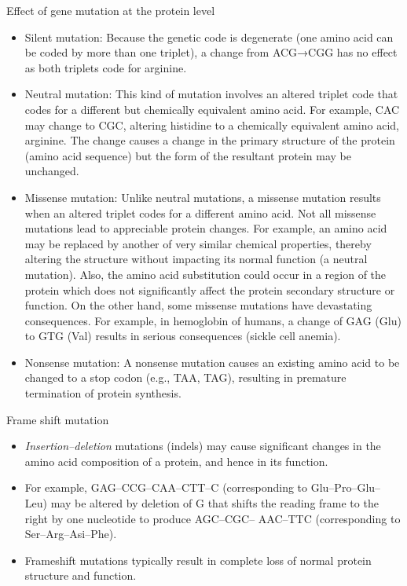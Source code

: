 \documentclass[11pt,ignorenonframetext,aspectratio=169]{beamer}
\providecommand{\tightlist}{%
  \setlength{\itemsep}{0pt}\setlength{\parskip}{0pt}}
\begin{document}
\begin{frame}{Effect of gene mutation at the protein level}
\protect\hypertarget{effect-of-gene-mutation-at-the-protein-level}{}
\small

\begin{itemize}
\tightlist
\item
  Silent mutation: Because the genetic code is degenerate (one amino
  acid can be coded by more than one triplet), a change from ACG→CGG has
  no effect as both triplets code for arginine.
\item
  Neutral mutation: This kind of mutation involves an altered triplet
  code that codes for a different but chemically equivalent amino acid.
  For example, CAC may change to CGC, altering histidine to a chemically
  equivalent amino acid, arginine. The change causes a change in the
  primary structure of the protein (amino acid sequence) but the form of
  the resultant protein may be unchanged.
\item
  Missense mutation: Unlike neutral mutations, a missense mutation
  results when an altered triplet codes for a different amino acid. Not
  all missense mutations lead to appreciable protein changes. For
  example, an amino acid may be replaced by another of very similar
  chemical properties, thereby altering the structure without impacting
  its normal function (a neutral mutation). Also, the amino acid
  substitution could occur in a region of the protein which does not
  significantly affect the protein secondary structure or function. On
  the other hand, some missense mutations have devastating consequences.
  For example, in hemoglobin of humans, a change of GAG (Glu) to GTG
  (Val) results in serious consequences (sickle cell anemia).
\item
  Nonsense mutation: A nonsense mutation causes an existing amino acid
  to be changed to a stop codon (e.g., TAA, TAG), resulting in premature
  termination of protein synthesis.
\end{itemize}
\end{frame}

\begin{frame}{Frame shift mutation}
\protect\hypertarget{frame-shift-mutation}{}
\begin{itemize}
\tightlist
\item
  \emph{Insertion--deletion} mutations (indels) may cause significant
  changes in the amino acid composition of a protein, and hence in its
  function.
\item
  For example, GAG--CCG--CAA--CTT--C (corresponding to
  Glu--Pro--Glu--Leu) may be altered by deletion of G that shifts the
  reading frame to the right by one nucleotide to produce AGC--CGC--
  AAC--TTC (corresponding to Ser--Arg--Asi--Phe).
\item
  Frameshift mutations typically result in complete loss of normal
  protein structure and function.
\end{itemize}
\end{frame}
\end{document}
